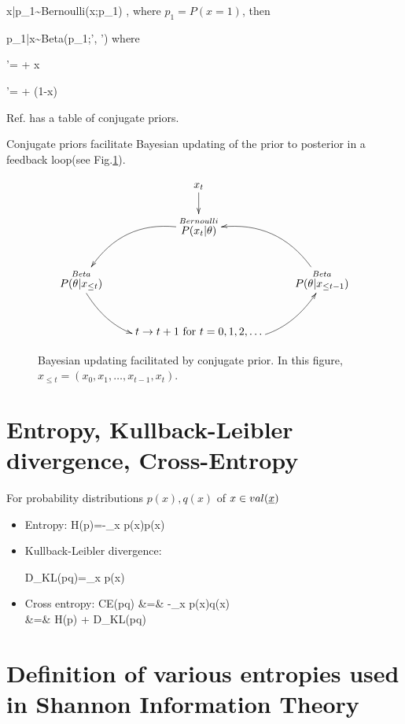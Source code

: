 \beq
x|p_1\sim {\rm Bernoulli}(x;p_1)
\;,
\eeq
where $p_1=P(x=1)$,
then

\beq
p_1|x\sim {\rm Beta}(p_1;\alp', \beta')
\eeq
where

\beq
\alp'= \alp + x
\eeq

\beq
\beta'= \beta + (1-x)
\eeq


Ref.\cite{wiki-conj-prior}
has a table of
conjugate priors.

Conjugate priors facilitate
Bayesian updating
of the prior to
posterior in a
feedback loop(see Fig.\ref{fig-conj-prior}).

\begin{figure}[h!]
$$\xymatrix{
&x_t\ar[d]
\\
&\stackrel{Bernoulli}{P(x_t|\theta)}\ar@/_2pc/[ld]
\\
\stackrel{Beta}{P(\theta|x_{\leq t})}\ar@/_2pc/[rd]
&&\stackrel{Beta}{P(\theta|x_{\leq t-1})}\ar@/_2pc/[ul]
\\
&t\rarrow t+1 \text{ for } t=0, 1, 2,\ldots
\ar@/_2pc/[ur]
}$$
\caption{Bayesian updating facilitated
by conjugate prior. In this figure,
$x_{\leq t}=(x_0, x_1, \ldots, x_{t-1}, x_t)$.}
\label{fig-conj-prior}
\end{figure}



\section{Entropy,
 Kullback-Leibler divergence, Cross-Entropy}

For probability distributions $p(x), q(x)$ of $x\in val(\rvx)$
\begin{itemize}
\item
Entropy:
\beq
H(p)=-\sum_x p(x)\ln p(x)
\eeq

\item
Kullback-Leibler divergence:

\beq
D_{KL}(p\parallel q)=\sum_{x} p(x)\ln {}
\eeq
\item
Cross entropy:
\beqa
CE(p\parallel q) &=& -\sum_x p(x)\ln q(x)\\
&=& H(p) + D_{KL}(p\parallel q)
\eeqa
\end{itemize}

\section{Definition of various
entropies used in Shannon Information Theory}
\label{sec-def-various-ents}

